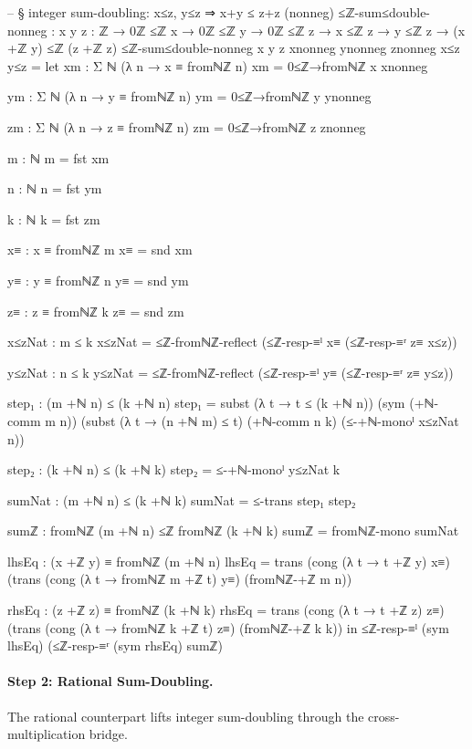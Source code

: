 \documentclass[11pt,a4paper]{book}
\begin{document}
\begin{code}
-- § integer sum-doubling: x≤z, y≤z ⇒ x+y ≤ z+z (nonneg)
≤ℤ-sum≤double-nonneg : {x y z : ℤ} →
  0ℤ ≤ℤ x → 0ℤ ≤ℤ y → 0ℤ ≤ℤ z → x ≤ℤ z → y ≤ℤ z → (x +ℤ y) ≤ℤ (z +ℤ z)
≤ℤ-sum≤double-nonneg {x} {y} {z} xnonneg ynonneg znonneg x≤z y≤z =
  let
    xm : Σ ℕ (λ n → x ≡ fromℕℤ n)
    xm = 0≤ℤ→fromℕℤ x xnonneg

    ym : Σ ℕ (λ n → y ≡ fromℕℤ n)
    ym = 0≤ℤ→fromℕℤ y ynonneg

    zm : Σ ℕ (λ n → z ≡ fromℕℤ n)
    zm = 0≤ℤ→fromℕℤ z znonneg

    m : ℕ
    m = fst xm

    n : ℕ
    n = fst ym

    k : ℕ
    k = fst zm

    x≡ : x ≡ fromℕℤ m
    x≡ = snd xm

    y≡ : y ≡ fromℕℤ n
    y≡ = snd ym

    z≡ : z ≡ fromℕℤ k
    z≡ = snd zm

    x≤zNat : m ≤ k
    x≤zNat = ≤ℤ-fromℕℤ-reflect (≤ℤ-resp-≡ˡ x≡ (≤ℤ-resp-≡ʳ z≡ x≤z))

    y≤zNat : n ≤ k
    y≤zNat = ≤ℤ-fromℕℤ-reflect (≤ℤ-resp-≡ˡ y≡ (≤ℤ-resp-≡ʳ z≡ y≤z))

    step₁ : (m +ℕ n) ≤ (k +ℕ n)
    step₁ =
      subst (λ t → t ≤ (k +ℕ n))
        (sym (+ℕ-comm m n))
        (subst (λ t → (n +ℕ m) ≤ t)
          (+ℕ-comm n k)
          (≤-+ℕ-monoˡ x≤zNat n))

    step₂ : (k +ℕ n) ≤ (k +ℕ k)
    step₂ = ≤-+ℕ-monoˡ y≤zNat k

    sumNat : (m +ℕ n) ≤ (k +ℕ k)
    sumNat = ≤-trans step₁ step₂

    sumℤ : fromℕℤ (m +ℕ n) ≤ℤ fromℕℤ (k +ℕ k)
    sumℤ = fromℕℤ-mono sumNat

    lhsEq : (x +ℤ y) ≡ fromℕℤ (m +ℕ n)
    lhsEq =
      trans
        (cong (λ t → t +ℤ y) x≡)
        (trans
          (cong (λ t → fromℕℤ m +ℤ t) y≡)
          (fromℕℤ-+ℤ m n))

    rhsEq : (z +ℤ z) ≡ fromℕℤ (k +ℕ k)
    rhsEq =
      trans
        (cong (λ t → t +ℤ z) z≡)
        (trans
          (cong (λ t → fromℕℤ k +ℤ t) z≡)
          (fromℕℤ-+ℤ k k))
  in
  ≤ℤ-resp-≡ˡ (sym lhsEq) (≤ℤ-resp-≡ʳ (sym rhsEq) sumℤ)
\end{code}

\paragraph{Step 2: Rational Sum-Doubling.}
The rational counterpart lifts integer sum-doubling
through the cross-multiplication bridge.
\end{document}
